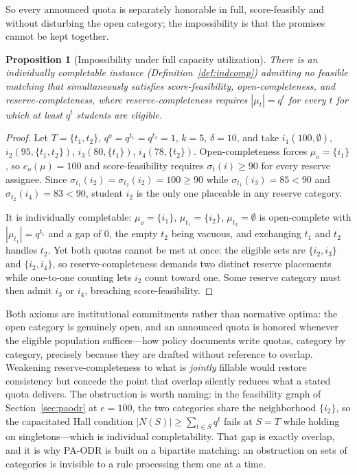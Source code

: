 \documentclass[a4paper,twoside]{article}
\newtheorem{proposition}{Proposition}
\theoremstyle{definition}
\begin{document}
So every announced quota is separately honorable in full, score-feasibly and without disturbing the open category; the impossibility is that the promises cannot be kept together.

\begin{proposition}[Impossibility under full capacity utilization]
\label{prop:impossibility}
There is an individually completable instance (Definition~\ref{def:indcomp}) admitting no feasible matching that simultaneously satisfies score-feasibility, \emph{open-completeness}, and \emph{reserve-completeness}, where reserve-completeness requires $|\mu_t|=q^t$ for every $t$ for which at least $q^t$ students are eligible.
\end{proposition}

\begin{proof}
Let $T=\{t_1,t_2\}$, $q^o=q^{t_1}=q^{t_2}=1$, $k=5$, $\delta=10$, and take $i_1(100,\emptyset)$, $i_2(95,\{t_1,t_2\})$, $i_3(80,\{t_1\})$, $i_4(78,\{t_2\})$. Open-completeness forces $\mu_o=\{i_1\}$, so $e_o(\mu)=100$ and score-feasibility requires $\sigma_t(i)\ge90$ for every reserve assignee. Since $\sigma_{t_1}(i_2)=\sigma_{t_2}(i_2)=100\ge90$ while $\sigma_{t_1}(i_3)=85<90$ and $\sigma_{t_2}(i_4)=83<90$, student $i_2$ is the only one placeable in any reserve category.

It is individually completable: $\mu_o=\{i_1\}$, $\mu_{t_1}=\{i_2\}$, $\mu_{t_2}=\emptyset$ is open-complete with $|\mu_{t_1}|=q^{t_1}$ and a gap of $0$, the empty $t_2$ being vacuous, and exchanging $t_1$ and $t_2$ handles $t_2$. Yet both quotas cannot be met at once: the eligible sets are $\{i_2,i_3\}$ and $\{i_2,i_4\}$, so reserve-completeness demands two distinct reserve placements while one-to-one counting lets $i_2$ count toward one. Some reserve category must then admit $i_3$ or $i_4$, breaching score-feasibility.
\end{proof}

Both axioms are institutional commitments rather than normative optima: the open category is genuinely open, and an announced quota is honored whenever the eligible population suffices---how policy documents write quotas, category by category, precisely because they are drafted without reference to overlap. Weakening reserve-completeness to what is \emph{jointly} fillable would restore consistency but concede the point that overlap silently reduces what a stated quota delivers. The obstruction is worth naming: in the feasibility graph of Section~\ref{sec:paodr} at $e=100$, the two categories share the neighborhood $\{i_2\}$, so the capacitated Hall condition $|N(S)|\ge\sum_{t\in S}q^t$ fails at $S=T$ while holding on singletons---which is individual completability. That gap is exactly overlap, and it is why PA-ODR is built on a bipartite matching: an obstruction on sets of categories is invisible to a rule processing them one at a time.
\end{document}
